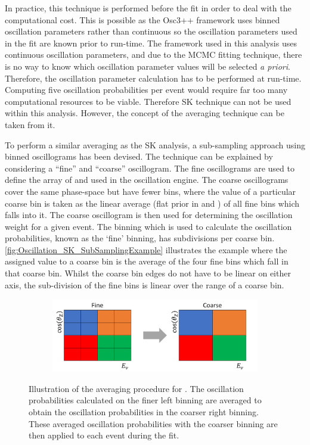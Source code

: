 In practice, this technique is performed before the fit in order to deal with the computational cost. This is possible as the Osc3++ framework uses binned oscillation parameters rather than continuous so the oscillation parameters used in the fit are known prior to run-time. The framework used in this analysis uses continuous oscillation parameters, and due to the MCMC fitting technique, there is no way to know which oscillation parameter values will be selected \textit{a priori}. Therefore, the oscillation parameter calculation has to be performed at run-time. Computing five oscillation probabilities per event would require far too many computational resources to be viable. Therefore SK technique can not be used within this analysis. However, the concept of the averaging technique can be taken from it.

To perform a similar averaging as the SK analysis, a sub-sampling approach using binned oscillograms has been devised. The technique can be explained by considering a ``fine'' and ``coarse'' oscillogram. The fine oscillograms are used to define the array of  and  used in the oscillation engine. The coarse oscillograms cover the same phase-space but have fewer bins, where the value of a particular coarse bin is taken as the linear average (flat prior in  and ) of all fine bins which falls into it. The coarse oscillogram is then used for determining the oscillation weight for a given event. The binning which is used to calculate the oscillation probabilities, known as the `fine' binning, has  subdivisions per coarse bin. \autoref{fig:Oscillation_SK_SubSamplingExample} illustrates the  example where the assigned value to a coarse bin is the average of the four fine bins which fall in that coarse bin. Whilst the coarse bin edges do not have to be linear on either axis, the sub-division of the fine bins is linear over the range of a coarse bin.

\begin{figure}[h]
  \begin{subfigure}[t]{\textwidth}
    \includegraphics[width=\textwidth, trim={0mm 0mm 0mm 0mm}, clip,page=1]{Figures/Oscillation/SubSamplingExample.pdf}
  \end{subfigure}
  \caption{Illustration of the averaging procedure for . The oscillation probabilities calculated on the finer left binning are averaged to obtain the oscillation probabilities in the coarser right binning. These averaged oscillation probabilities with the coarser binning are then applied to each event during the fit.}
  \label{fig:Oscillation_SK_SubSamplingExample}
\end{figure}

